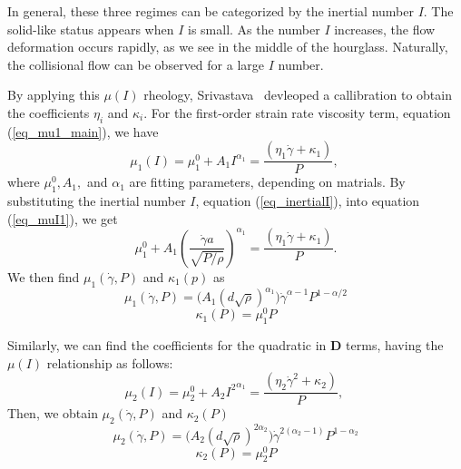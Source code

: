 \par
In general, these three regimes can be categorized by the inertial number $I$. The solid-like status appears when $I$ is small. As the number $I$ increases, the flow deformation occurs rapidly, as we see in the middle of the hourglass. Naturally, the collisional flow can be observed for a large $I$ number. 
\par
By applying this $\mu(I)$ rheology, Srivastava~\cite{srivastava_viscometric_2021} devleoped a callibration to obtain the coefficients $\eta_i$ and $\kappa_i$.
For the first-order strain rate viscosity term, equation (\ref{eq_mu1_main}), we have 
\begin{equation}
  \mu_1(I) = \mu_1^0 + A_1{ I}^{ \alpha_1} =  \frac{(\eta_1 \dot{\gamma} + \kappa_1)}{P},\
\label{eq_muI1}
\end{equation}
where $\mu_1^0, A_1,$ and $\alpha_1$ are fitting parameters, depending on matrials. 
By substituting the inertial number $I$, equation (\ref{eq_inertialI}), into equation (\ref{eq_muI1}), we get
\begin{equation}
     \mu_1^0 + A_1 {\left(  \frac{\dot{\gamma} a }{\sqrt{P/\rho}}\right) }^{ \alpha_1} =  \frac{(\eta_1 \dot{\gamma} + \kappa_1)}{P}.
\end{equation}
We then find $\mu_1 (\dot{\gamma}, P)$ and $\kappa_1(p)$ as
\begin{equation}
    \mu_1  (\dot{\gamma}, P)= 
    \biggl( A_1 {\left(   d  \sqrt{\rho} \right) }^{ \alpha_1}\biggr) 
     \dot{\gamma}^{\alpha-1} P^{1-\alpha/2}
\label{eq_eta1}
\end{equation}
\begin{equation}
    \kappa_1(P) = \mu_1^0 P
\label{eq_kappa1}
\end{equation}
\par
Similarly, we can find the coefficients for the quadratic in ${\bm D}$ terms, having the $\mu(I)$ relationship as follows:
\begin{equation}
    \mu_2(I) = \mu_2^0 + A_2{ I^2}^{ \alpha_1} =  \frac{(\eta_2 \dot{\gamma}^2 + \kappa_2)}{P},\
\label{eq_muI2}
\end{equation}
Then, we obtain $\mu_2 (\dot{\gamma}, P)$ and $\kappa_2(P)$
\begin{equation}
    \mu_2  (\dot{\gamma}, P)= 
    \biggl( A_2 {\left(   d  \sqrt{\rho} \right) }^{ 2\alpha_2}\biggr) 
     {\dot{\gamma}}^{2(\alpha_2-1)} P^{1-\alpha_2}
\label{eq_eta2}
\end{equation}
\begin{equation}
    \kappa_2(P) = \mu_2^0 P
\label{eq_kappa2}
\end{equation}

